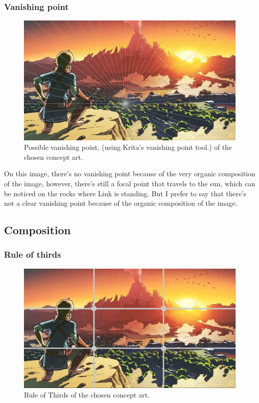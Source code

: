 \documentclass{cup-pan}
\begin{document}
            \subsubsection{Vanishing point}
                \begin{figure}[H]
                    \includegraphics[width=\textwidth]{Imagenes/Referencias/Analisis_ConceptArt/posiblepuntofuga.png}
                    \caption{Possible vanishing point. (using Krita's vanishing point tool.) of the chosen concept art.}
                \end{figure}
                On this image, there's no vanishing point because of the very organic composition of the image, however, there's still a focal point that travels to the sun, which can be noticed on the rocks where Link is standing. 
                But I prefer to say that there's not a clear vanishing point because of the organic composition of the image.
        \newpage
        \subsection{Composition}
            \subsubsection{Rule of thirds}
                \begin{figure}[H]
                    \includegraphics[width=\textwidth]{Imagenes/Referencias/Analisis_ConceptArt/tercios.png}
                    \caption{Rule of Thirds of the chosen concept art.}
                \end{figure}
\end{document}
